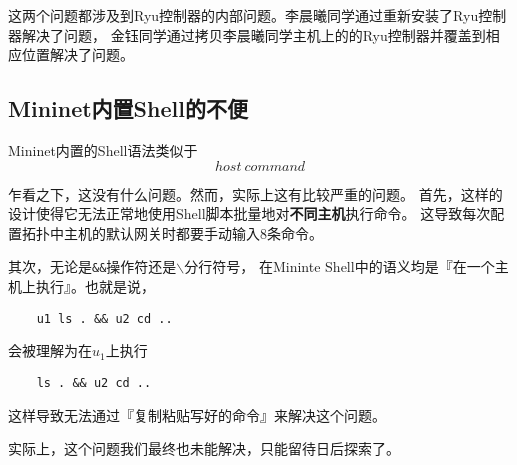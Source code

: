 这两个问题都涉及到Ryu控制器的内部问题。李晨曦同学通过重新安装了Ryu控制器解决了问题，
金钰同学通过拷贝李晨曦同学主机上的的Ryu控制器并覆盖到相应位置解决了问题。

\subsection{Mininet内置Shell的不便}

Mininet内置的Shell语法类似于
$$ host\ command $$

乍看之下，这没有什么问题。然而，实际上这有比较严重的问题。
首先，这样的设计使得它无法正常地使用Shell脚本批量地对\textbf{不同主机}执行命令。
这导致每次配置拓扑中主机的默认网关时都要手动输入8条命令。

其次，无论是\texttt{\&\&}操作符还是\texttt{$\backslash$}分行符号，
在Mininte Shell中的语义均是『在一个主机上执行』。也就是说，

\begin{lstlisting}
	u1 ls . && u2 cd ..
\end{lstlisting}

会被理解为在$u_1$上执行

\begin{lstlisting}
	ls . && u2 cd ..
\end{lstlisting}

这样导致无法通过『复制粘贴写好的命令』来解决这个问题。

实际上，这个问题我们最终也未能解决，只能留待日后探索了。

